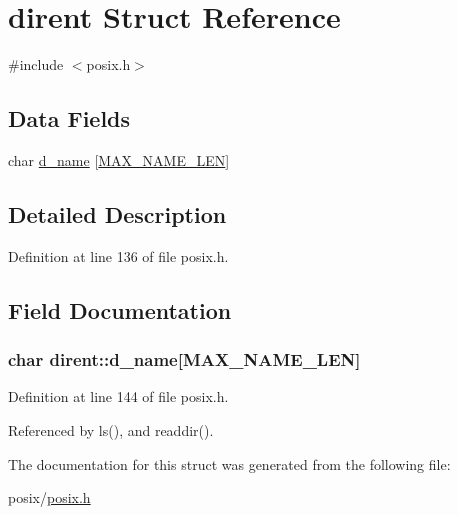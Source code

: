\hypertarget{structdirent}{}\section{dirent Struct Reference}
\label{structdirent}


{\ttfamily \#include $<$posix.\+h$>$}

\subsection*{Data Fields}
\begin{DoxyCompactItemize}
\item 
char \hyperlink{structdirent_ae61380f3ccbc6c32e8650d7bce76197b}{d\+\_\+name} \mbox{[}\hyperlink{posix_8h_afd709f201d7643c3909621f620ea648a}{M\+A\+X\+\_\+\+N\+A\+M\+E\+\_\+\+L\+EN}\mbox{]}
\end{DoxyCompactItemize}


\subsection{Detailed Description}


Definition at line 136 of file posix.\+h.



\subsection{Field Documentation}
\subsubsection[{\texorpdfstring{d\+\_\+name}{d_name}}]{\setlength{\rightskip}{0pt plus 5cm}char dirent\+::d\+\_\+name\mbox{[}{\bf M\+A\+X\+\_\+\+N\+A\+M\+E\+\_\+\+L\+EN}\mbox{]}}\hypertarget{structdirent_ae61380f3ccbc6c32e8650d7bce76197b}{}\label{structdirent_ae61380f3ccbc6c32e8650d7bce76197b}


Definition at line 144 of file posix.\+h.



Referenced by ls(), and readdir().



The documentation for this struct was generated from the following file\+:\begin{DoxyCompactItemize}
\item 
posix/\hyperlink{posix_8h}{posix.\+h}\end{DoxyCompactItemize}
